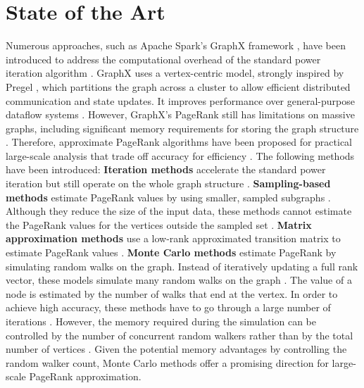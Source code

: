 \documentclass[a4paper,12pt]{article}
\begin{document}
\section{State of the Art}
Numerous approaches, such as Apache Spark's GraphX framework \cite{xin_graphx_2013}, have been introduced to address the computational overhead of the standard power iteration algorithm \cite{page_pagerank_1999}.
GraphX uses a vertex-centric model, strongly inspired by Pregel \cite{malewicz_pregel_2010}, which partitions the graph across a cluster to allow efficient distributed communication and state updates. It improves performance over general-purpose dataflow systems \cite{jin_software_2022}. However, GraphX's PageRank still has limitations on massive graphs, including significant memory requirements for storing the graph structure \cite{wu_efficient_2024}\cite{xin_graphx_2014}. Therefore, approximate PageRank algorithms have been proposed for practical large-scale analysis that trade off accuracy for efficiency \cite{wu_efficient_2024}. The following methods have been introduced:
\textbf{Iteration methods} \cite{xie_parameterised_2023}\cite{anikin_efficient_2022} accelerate the standard power iteration but still operate on the whole graph structure \cite{wu_efficient_2024}. 
\textbf{Sampling-based methods} estimate PageRank values by using smaller, sampled subgraphs \cite{bar-yossef_local_2008}\cite{chen_local_2004}. Although they reduce the size of the input data, these methods cannot estimate the PageRank values for the vertices outside the sampled set \cite{wu_efficient_2024}.
\textbf{Matrix approximation methods} use a low-rank approximated transition matrix to estimate PageRank values \cite{liu_fast_2015}\cite{benczur_feasibility_2005}. 
\textbf{Monte Carlo methods} estimate PageRank by simulating random walks on the graph. Instead of iteratively updating a full rank vector, these models simulate many random walks on the graph \cite{avrachenkov_monte_2007}. The value of a node is estimated by the number of walks that end at the vertex. In order to achieve high accuracy, these methods have to go through a large number of iterations \cite{wu_efficient_2024}. However, the memory required during the simulation can be controlled by the number of concurrent random walkers rather than by the total number of vertices \cite{avrachenkov_monte_2007}. Given the potential memory advantages by controlling the random walker count, Monte Carlo methods offer a promising direction for large-scale PageRank approximation.
 
\end{document}
